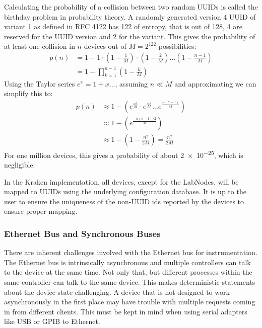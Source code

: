 Calculating the probability of a collision between two random UUIDs is called the birthday problem \cite{BirthdayProblem} in probability theory. A randomly generated version 4 UUID of variant 1 as defined in RFC 4122 \cite{rfc_uuid} has \qty{122}{\bit} of entropy, that is out of \qty{128}{\bit}, \qty{4}{\bit} are reserved for the UUID version and \qty{2}{\bit} for the variant. This gives the probability of at least one collision in $n$ devices out of $M = 2^{122}$ possibilities:
\begin{align}
    p(n) &= 1 - 1 \cdot \left(1 - \frac{1}{M}\right) \cdot \left(1 - \frac{2}{M}\right) \dots \left(1 - \frac{n-1}{M}\right) \nonumber\\
    &= 1 - \prod_{k=1}^{n-1} \left(1 - \frac{k}{M} \right)
\end{align}
Using the Taylor series $e^x = 1+x \dots$, assuming $n \ll M$ and approximating we can simplify this to:
\begin{align}
    p(n) &\approx 1 - \left(e^\frac{-1}{M} \cdot e^\frac{-2}{M} \dots e^\frac{-(n-1)}{M} \right) \nonumber\\
    &\approx 1 - \left(e^\frac{-n(n-1)/2}{M} \right) \nonumber\\
    &\approx 1 - \left(1 - \frac{n^2}{2 M} \right) = \frac{n^2}{2 M}
\end{align}
For one million devices, this gives a probability of about \num{2e-25}, which is negligible.

In the Kraken implementation, all devices, except for the LabNodes, will be mapped to UUIDs using the underlying configuration database. It is up to the user to ensure the uniqueness of the non-UUID ids reported by the devices to ensure proper mapping.

\subsubsection{Ethernet Bus and Synchronous Buses}
There are inherent challenges involved with the Ethernet bus for instrumentation. The Ethernet bus is intrinsically asynchronous and multiple controllers can talk to the device at the same time. Not only that, but different processes within the same controller can talk to the same device. This makes deterministic statements about the device state challenging. A device that is not designed to work asynchronously in the first place may have trouble with multiple requests coming in from different clients. This must be kept in mind when using serial adapters like USB or GPIB to Ethernet.

